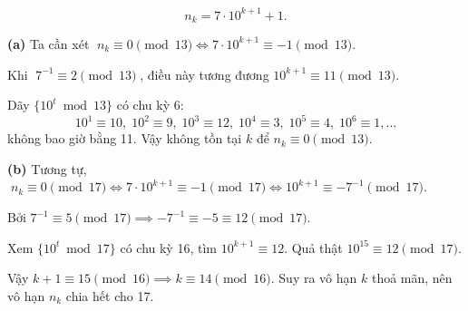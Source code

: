 \documentclass[../05-modular-arithmetic-a.tex]{subfiles}
\begin{document}
\begin{soln}\footnotemark
	\[
		n_k = 7 \cdot 10^{k+1} + 1.
	\]
	
	\textbf{(a)} Ta cần xét \(\;n_k\equiv 0\pmod{13}\iff 7\cdot 10^{k+1}\equiv -1\pmod{13}\).  
	
	Khi \(\;7^{-1}\equiv 2\pmod{13}\;\), điều này tương đương \(10^{k+1}\equiv 11\pmod{13}\).  

	Dãy \(\{10^t\bmod13\}\) có chu kỳ 6: 
	\[
		10^1\equiv10,\;10^2\equiv9,\;10^3\equiv12,\;10^4\equiv3,\;10^5\equiv4,\;10^6\equiv1,\dots
	\]
	không bao giờ bằng 11. Vậy không tồn tại \(k\) để \(n_k\equiv0\pmod{13}\).  

	\textbf{(b)} Tương tự, \(\;n_k\equiv0\pmod{17}\iff 7\cdot 10^{k+1}\equiv -1\pmod{17}\iff 10^{k+1}\equiv -7^{-1}\pmod{17}\).  
	
	Bởi \(7^{-1}\equiv5\pmod{17}\implies -7^{-1}\equiv -5\equiv12\pmod{17}\).  
	
	Xem \(\{10^t\bmod17\}\) có chu kỳ 16, tìm \(10^{k+1}\equiv12\). Quả thật \(10^{15}\equiv12\pmod{17}\).
	
	Vậy \(k+1\equiv15\pmod{16}\implies k\equiv14\pmod{16}\). Suy ra vô hạn \(k\) thoả mãn, nên vô hạn \(n_k\) chia hết cho 17.
\end{soln}

\end{document}
